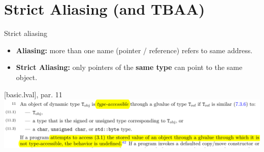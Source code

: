 \section{Strict Aliasing (and TBAA)}

\begin{frame}{Strict aliasing}
  \begin{itemize}
  \item \textbf{Aliasing:} more than one name (pointer / reference) refers to same address.\\[1ex]
  \item \textbf{Strict Aliasing:} only pointers of the \textbf{same type} can point to the same object.
  \end{itemize}

  \vfill
  \begin{block}{[basic.lval], par. 11}
    \includegraphics[width=\textwidth]{img/cplusplus_draft/basic.lval.11.png}
  \end{block}
\end{frame}

